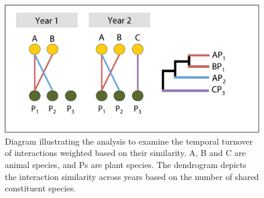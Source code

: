 \documentclass[12pt]{article}
\begin{document}



\clearpage
\begin{figure}
  \centering
  \includegraphics[width=.8\textwidth]{figures/scheme.pdf}
  \caption{Diagram illustrating the analysis to examine the temporal
    turnover of interactions weighted based on their similarity. A, B
    and C are animal species, and Ps are plant species. The dendrogram
    depicts the interaction similarity across years based on the
    number of shared constituent species.}
  \label{fig:methods}
\end{figure}
\clearpage
\end{document}
